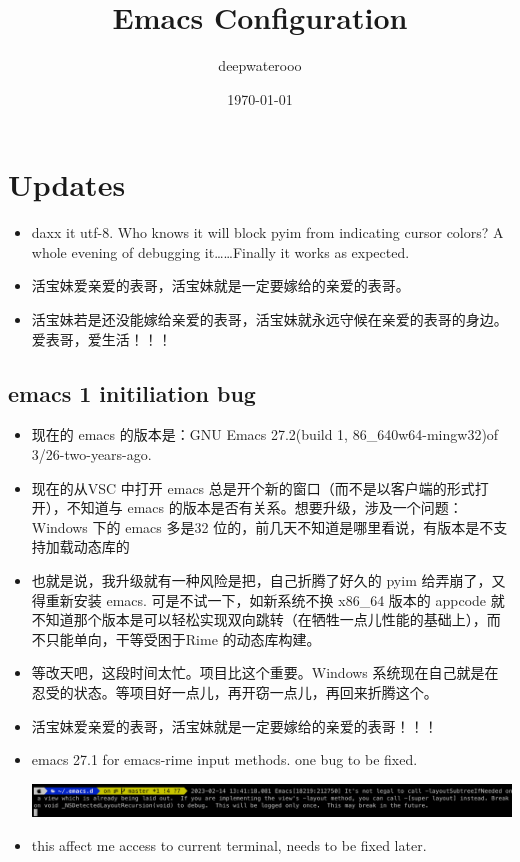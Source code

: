 \documentclass[9pt, b5paper]{article}
\author{deepwaterooo}
\date{\today}
\title{Emacs Configuration}
\begin{document}
\maketitle
\tableofcontents


\section{Updates}
\label{sec:org3055f32}
\begin{itemize}
\item daxx it utf-8. Who knows it will block pyim from indicating cursor colors? A whole evening of debugging it\ldots{}\ldots{}Finally it works as expected.
\item 活宝妹爱亲爱的表哥，活宝妹就是一定要嫁给的亲爱的表哥。
\item 活宝妹若是还没能嫁给亲爱的表哥，活宝妹就永远守候在亲爱的表哥的身边。爱表哥，爱生活！！！
\end{itemize}

\subsection{{\bfseries\sffamily emacs} 1 initiliation bug}
\label{sec:orgf7aff97}
\begin{itemize}
\item 现在的 emacs 的版本是：GNU Emacs 27.2(build 1, 86\_640w64-mingw32)of 3/26-two-years-ago.
\item 现在的从VSC 中打开 emacs 总是开个新的窗口（而不是以客户端的形式打开），不知道与 emacs 的版本是否有关系。想要升级，涉及一个问题：Windows 下的 emacs 多是32 位的，前几天不知道是哪里看说，有版本是不支持加载动态库的
\item 也就是说，我升级就有一种风险是把，自己折腾了好久的 pyim 给弄崩了，又得重新安装 emacs. 可是不试一下，如新系统不换 x86\_64 版本的 appcode 就不知道那个版本是可以轻松实现双向跳转（在牺牲一点儿性能的基础上），而不只能单向，干等受困于Rime 的动态库构建。
\item 等改天吧，这段时间太忙。项目比这个重要。Windows 系统现在自己就是在忍受的状态。等项目好一点儿，再开窃一点儿，再回来折腾这个。
\item 活宝妹爱亲爱的表哥，活宝妹就是一定要嫁给的亲爱的表哥！！！
\item emacs 27.1 for emacs-rime input methods. one bug to be fixed. 

\begin{center}
\includegraphics[width=.9\linewidth]{./pic/readme_20230214_134351.png}
\end{center}
\item this affect me access to current terminal, needs to be fixed later.
\end{itemize}
\end{document}
